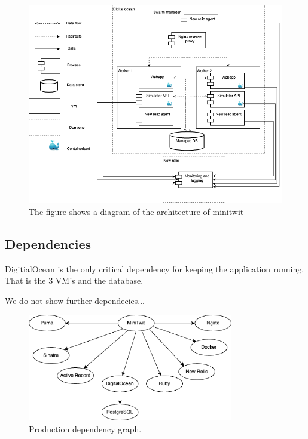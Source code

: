 \documentclass{article}
\begin{document}
\begin{figure}[H]
    \centering
    \includegraphics[width=\textwidth]{images/devops-overview.png}
    \caption{The figure shows a diagram of the architecture of minitwit}
    \label{fig:architecture}
\end{figure}

\subsection{Dependencies}


DigitialOcean is the only critical dependency for keeping the application running. That is the 3 VM's and the database. 

We do not show further dependecies... 

\begin{figure}[H]
    \centering
    \includegraphics[width=0.8\textwidth]{images/dependency-graph-prod.png}
    \caption{Production dependency graph.}
    \label{fig:dep-prod}
\end{figure}
\end{document}
